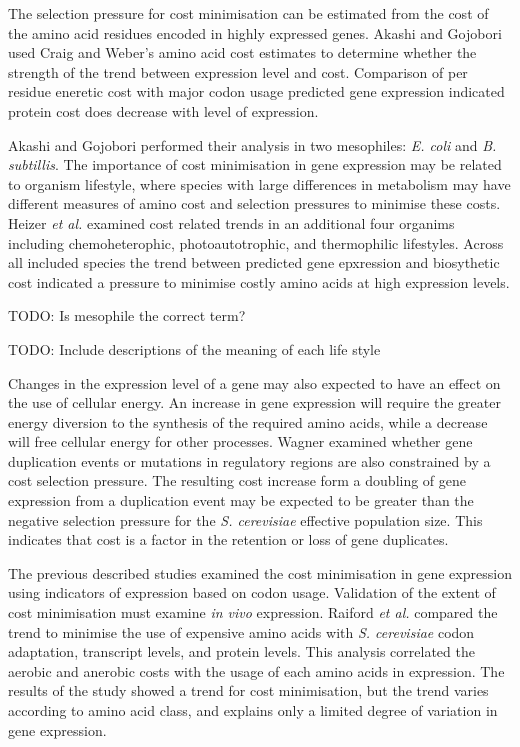 The selection pressure for cost minimisation can be estimated from the cost of the amino acid residues encoded in highly expressed genes. Akashi and Gojobori \cite{akashi2002} used Craig and Weber's amino acid cost estimates \cite{craig1998} to determine whether the strength of the trend between expression level and cost. Comparison of per residue eneretic cost with major codon usage predicted gene expression \cite{kanaya1999} indicated protein cost does decrease with level of expression.

Akashi and Gojobori performed their analysis in two mesophiles: \emph{E. coli} and \emph{B. subtillis}. The importance of cost minimisation in gene expression may be related to organism lifestyle, where species with large differences in metabolism may have different measures of amino cost and selection pressures to minimise these costs. Heizer \emph{et al.} \cite{heizer2006} examined cost related trends in an additional four organims including chemoheterophic, photoautotrophic, and thermophilic lifestyles. Across all included species the trend between predicted gene epxression and biosythetic cost indicated a pressure to minimise costly amino acids at high expression levels.

TODO: Is mesophile the correct term?

TODO: Include descriptions of the meaning of each life style

Changes in the expression level of a gene may also expected to have an effect on the use of cellular energy. An increase in gene expression will require the greater energy diversion to the synthesis of the required amino acids, while a decrease will free cellular energy for other processes. Wagner \cite{wager2005} examined whether gene duplication events or mutations in regulatory regions are also constrained by a cost selection pressure. The resulting cost increase form a doubling of gene expression from a duplication event may be expected to be greater than the negative selection pressure for the \emph{S. cerevisiae} effective population size. This indicates that cost is a factor in the retention or loss of gene duplicates.

The previous described studies examined the cost minimisation in gene expression using indicators of expression based on codon usage. Validation of the extent of cost minimisation must examine \emph{in vivo} expression. Raiford \emph{et al.} \cite{raiford2008} compared the trend to minimise the use of expensive amino acids with \emph{S. cerevisiae} codon adaptation, transcript levels, and protein levels. This analysis correlated the aerobic and anerobic costs with the usage of each amino acids in expression. The results of the study showed a trend for cost minimisation, but the trend varies according to amino acid class, and explains only a limited degree of variation in gene expression.


